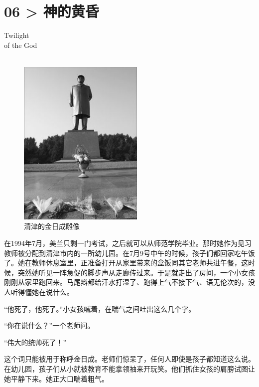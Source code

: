 \chapter*{06 > 神的黄昏}
\vspace{5mm}
\begin{flushright}
	\textcolor{PinYinColor}{\EN \huge{Twilight\\
			of the God\\
			\ \\}}
\end{flushright}

\begin{figure}[!htbp]
	\centering
	\includegraphics[width=6cm]{./Chapters/Images/06.jpg}
	\caption*{清津的金日成雕像}
\end{figure}

在1994年7月，美兰只剩一门考试，之后就可以从师范学院毕业。那时她作为见习教师被分配到清津市内的一所幼儿园。在7月9号中午的时候，孩子们都回家吃午饭了。她在教师休息室里，正准备打开从家里带来的盒饭同其它老师共进午餐，这时候，突然她听见一阵急促的脚步声从走廊传过来。于是就走出了房间，一个小女孩刚刚从家里跑回来。马尾辫都给汗水打湿了、跑得上气不接下气、语无伦次的，没人听得懂她在说什么。

“他死了，他死了。”小女孩喊着，在喘气之间吐出这么几个字。

“你在说什么？”一个老师问。

“伟大的统帅死了！”

这个词只能被用于称呼金日成。老师们惊呆了，任何人即使是孩子都知道这么说。在幼儿园，孩子们从小就被教育不能拿领袖来开玩笑。他们抓住女孩的肩膀试图让她平静下来。她正大口喘着粗气。

